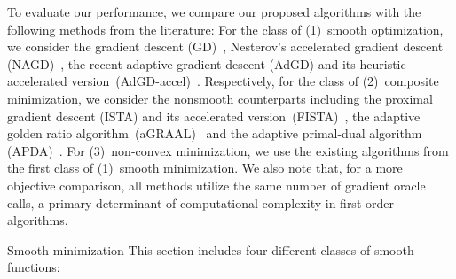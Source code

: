 \documentclass[11pt, a4paper, oneside, reqno]{amsart}
\makeatletter
\def\subsection{\@startsection{subsection}{2}%
	\z@{.5\linespacing\@plus.7\linespacing}{.5\linespacing}%
	{\normalfont\large\bfseries}}
\makeatother
\begin{document}
To evaluate our performance, we compare our proposed algorithms with the following methods from the literature: For the class of (1)~smooth optimization, we consider the gradient descent (GD)~\cite{Nocedal2006}, Nesterov's accelerated gradient descent (NAGD)~\cite{Nesterov1983}, the recent adaptive gradient descent (AdGD) and its heuristic accelerated version~(AdGD-accel)~\cite{Malitsky2020}. Respectively, for the class of (2)~composite minimization, we consider the nonsmooth counterparts including the proximal gradient descent (ISTA) and its accelerated version~(FISTA)~\cite{Beck2009}, the adaptive golden ratio algorithm~(aGRAAL)~\cite{malitsky2020golden} and the adaptive primal-dual algorithm (APDA)~\cite{vladarean2021first}. For (3)~non-convex minimization, we use the existing algorithms from the first class of (1)~smooth minimization. {We also note that, for a more objective comparison, all methods utilize the same number of gradient oracle calls, a primary determinant of computational complexity in first-order algorithms.}

\subsection{Smooth minimization}\label{subsec: smooth-numerics}
This section includes four different classes of smooth functions: 
\end{document}
